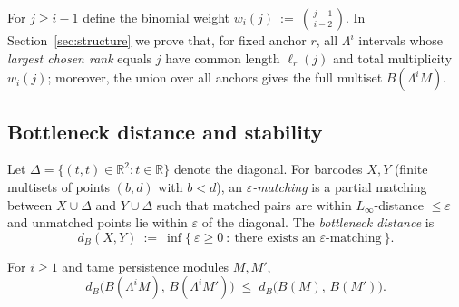 \documentclass[runningheads]{llncs}
\newcommand{\R}{\mathbb{R}}
\newcommand{\B}{B}
\newcommand{\Lam}{\Lambda}
\begin{document}


For $j\ge i-1$ define the binomial weight
$w_i(j)\ :=\ \binom{j-1}{\,i-2\,}.$
In Section~\ref{sec:structure} we prove that, for fixed anchor $r$, all $\Lam^i$ intervals whose \emph{largest chosen rank} equals $j$ have common length $\ell_r(j)$ and total multiplicity $w_i(j)$; moreover, the union over all anchors gives the full multiset $\B(\Lam^i M)$.

\subsection{Bottleneck distance and stability}
Let $\Delta=\{(t,t)\in\R^2:t\in\R\}$ denote the diagonal. For barcodes $X,Y$ (finite multisets of points $(b,d)$ with $b<d$), an \emph{$\varepsilon$-matching} is a partial matching between $X\cup\Delta$ and $Y\cup\Delta$ such that matched pairs are within $L_\infty$-distance $\le\varepsilon$ and unmatched points lie within $\varepsilon$ of the diagonal. The \emph{bottleneck distance} is
\[
d_B(X,Y)\ :=\ \inf\{\ \varepsilon\ge 0\ :\ \text{there exists an $\varepsilon$-matching}\ \}.
\]

\begin{theorem}\label{thm:stability-exterior}
For $i\ge 1$ and tame persistence modules $M,M'$, 
\[
   d_B\!\bigl(\B(\Lam^i M),\, \B(\Lam^i M')\bigr)
   \;\le\; d_B\!\bigl(\B(M),\, \B(M')\bigr).
\]
\end{theorem}
\end{document}
